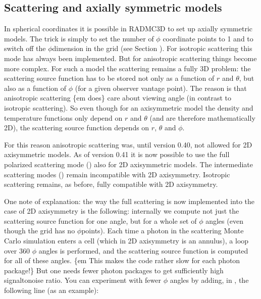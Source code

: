 \documentclass[letterpaper,10pt,english]{sphinxmanual}
\begin{document}
\subsection{Scattering and axially symmetric models}
\label{\detokenize{dustradtrans:scattering-and-axially-symmetric-models}}
In spherical coordinates it is possible in RADMC\sphinxhyphen{}3D to set up axially symmetric
models. The trick is simply to set the number of \(\phi\) coordinate points
 to 1 and to switch off the \(\phi\)\sphinxhyphen{}dimension in the grid (see
Section {\hyperref[\detokenize{inputoutputfiles:sec-grid-input}]{}}). For isotropic scattering this mode has always
been implemented. But for anisotropic scattering things become more complex. For
such a model the scattering remains a fully 3\sphinxhyphen{}D problem: the scattering source
function has to be stored not only as a function of \(r\) and
\(\theta\), but also as a function of \(\phi\) (for a given observer
vantage point). The reason is that anisotropic scattering \{em does\} care about
viewing angle (in contrast to isotropic scattering). So even though for an
axisymmetric model the density and temperature functions only depend on
\(r\) and \(\theta\) (and are therefore mathematically 2\sphinxhyphen{}D), the
scattering source function depends on \(r\), \(\theta\) and
\(\phi\).

For this reason anisotropic scattering was, until version 0.40, not allowed for
2\sphinxhyphen{}D axisymmetric models. As of version 0.41 it is now possible to use the full
polarized scattering mode () also for 2\sphinxhyphen{}D axisymmetric
models. The intermediate scattering modes () remain
incompatible with 2\sphinxhyphen{}D axisymmetry.  Isotropic scattering remains, as before,
fully compatible with 2\sphinxhyphen{}D axisymmetry.

One note of explanation: the way the full scattering is now implemented into
the case of 2\sphinxhyphen{}D axisymmetry is the following: internally we compute not just
the scattering source function for one angle, but for a whole set of \(\phi\)
angles (even though the grid has no \(\phi\)\sphinxhyphen{}points). Each time a photon in
the scattering Monte Carlo simulation enters a cell (which in 2\sphinxhyphen{}D
axisymmetry is an annulus), a loop over 360 \(\phi\) angles is performed, and
the scattering source function is computed for all of these angles.  \{em
This makes the code rather slow for each photon package!\} But one needs
fewer photon packages to get sufficiently high signal\sphinxhyphen{}to\sphinxhyphen{}noise ratio. You
can experiment with fewer \(\phi\) angles by adding, in ,
the following line (as an example):
\end{document}
